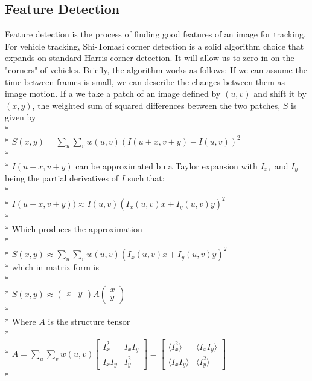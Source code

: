 \documentclass[draft]{article} %
\begin{document}
\subsection{Feature Detection}
Feature detection is the process of finding good features of an image for tracking. For vehicle tracking, Shi-Tomasi corner detection is a solid algorithm choice that expands on standard Harris corner detection. It will allow us to zero in on the "corners" of vehicles. Briefly, the algorithm works as follows: If we can assume the time between frames is small, we can describe the changes between them as image motion. If a we take a patch of an image defined by $(u,v)$ and shift it by $(x,y)$, the weighted sum of squared differences between the two patches, $S$ is given by \\*
\\*
$ S(x,y) = \sum\limits_{u}\sum\limits_{v}w(u,v)(I(u+x, v+y) - I(u,v))^2$ \\*
\\*
$I(u+x,v+y)$ can be approximated bu a Taylor expansion with $I_x,$ and $I_y$ being the partial derivatives of $I$ such that:\\*
\\*
$I(u+x,v+y)) \approx I(u,v) (I_x(u,v) x+I_y(u,v) y)^2$\\*
\\*
Which produces the approximation\\*
\\*
$S(x,y) \approx \sum\limits_{u}\sum\limits_{v}w(u,v) (I_x(u,v) x+I_y(u,v) y)^2$\\*
which in matrix form is\\*
\\*
$S(x,y) \approx \left(\begin{smallmatrix}
x & y
\end{smallmatrix}\right) A
\left(\begin{smallmatrix}
x\\
y
\end{smallmatrix}\right)$\\*
\\*
Where $A$ is the structure tensor\\*
\\*
$
A = \sum_u \sum_v w(u,v) 
\begin{bmatrix}
I_x^2 & I_x I_y \\
I_x I_y & I_y^2 
\end{bmatrix}
=
\begin{bmatrix}
\langle I_x^2 \rangle & \langle I_x I_y \rangle\\
\langle I_x I_y \rangle & \langle I_y^2 \rangle
\end{bmatrix}$\\*
\end{document}

